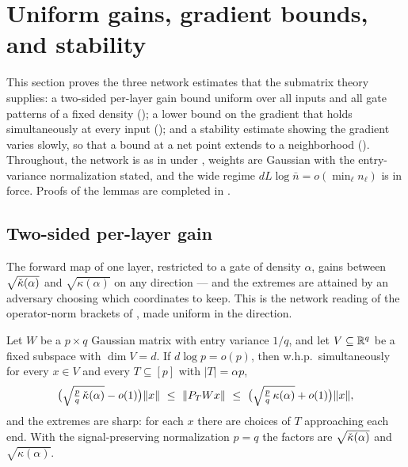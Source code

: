 \section{Uniform gains, gradient bounds, and stability}\label{sec:gains}

This section proves the three network estimates that the submatrix theory supplies: a two-sided
per-layer gain bound uniform over all inputs and all gate patterns of a fixed density
(); a lower bound on the gradient that holds simultaneously at every input
(); and a stability estimate showing the gradient varies slowly, so that a bound at
a net point extends to a neighborhood (). Throughout, the network is as in
 under , weights are Gaussian with the entry-variance
normalization stated, and the wide regime $dL\log\bar n=o(\min_\ell n_\ell)$ is in force. Proofs of the
lemmas are completed in .

\subsection{Two-sided per-layer gain}
The forward map of one layer, restricted to a gate of density $\alpha$, gains between
$\sqrt{\check{\kappa}(\alpha)}$ and $\sqrt{\kappa(\alpha)}$ on any direction --- and the extremes are attained
by an adversary choosing which coordinates to keep. This is the network reading of the operator-norm
brackets of , made uniform in the direction.

\begin{theorem}\label{thm:uniform-gain}
Let $W$ be a $p\times q$ Gaussian matrix with entry variance $1/q$, and let $V\subseteq\mathbb{R}^q$ be a fixed
subspace with $\dim V=d$. If $d\log p=o(p)$, then w.h.p.\ simultaneously for every $x\in V$ and every
$T\subseteq[p]$ with $|T|=\alpha p$,
\[
  \bigl(\sqrt{\tfrac pq\,\check{\kappa}(\alpha)}-o(1)\bigr)\|x\|\ \le\ \|P_TWx\|\ \le\
  \bigl(\sqrt{\tfrac pq\,\kappa(\alpha)}+o(1)\bigr)\|x\|,
\]
and the extremes are sharp: for each $x$ there are choices of $T$ approaching each end. With the
signal-preserving normalization $p=q$ the factors are $\sqrt{\check{\kappa}(\alpha)}$ and
$\sqrt{\kappa(\alpha)}$.
\end{theorem}

